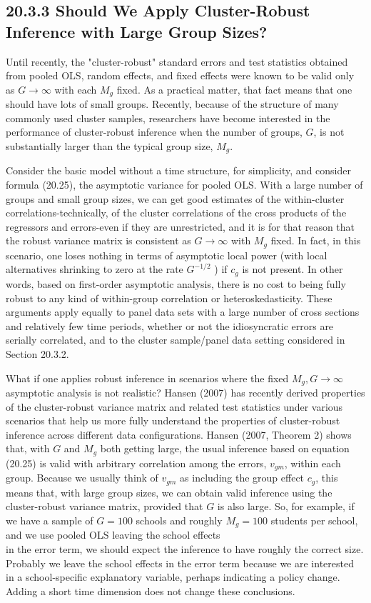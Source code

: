 \documentclass[10pt]{article}
\begin{document}
\subsection*{20.3.3 Should We Apply Cluster-Robust Inference with Large Group Sizes?}
Until recently, the "cluster-robust" standard errors and test statistics obtained from pooled OLS, random effects, and fixed effects were known to be valid only as $G \rightarrow \infty$ with each $M_{g}$ fixed. As a practical matter, that fact means that one should have lots of small groups. Recently, because of the structure of many commonly used cluster samples, researchers have become interested in the performance of cluster-robust inference when the number of groups, $G$, is not substantially larger than the typical group size, $M_{g}$.

Consider the basic model without a time structure, for simplicity, and consider formula (20.25), the asymptotic variance for pooled OLS. With a large number of groups and small group sizes, we can get good estimates of the within-cluster correlations-technically, of the cluster correlations of the cross products of the regressors and errors-even if they are unrestricted, and it is for that reason that the robust variance matrix is consistent as $G \rightarrow \infty$ with $M_{g}$ fixed. In fact, in this scenario, one loses nothing in terms of asymptotic local power (with local alternatives shrinking to zero at the rate $G^{-1 / 2}$ ) if $c_{g}$ is not present. In other words, based on first-order asymptotic analysis, there is no cost to being fully robust to any kind of within-group correlation or heteroskedasticity. These arguments apply equally to panel data sets with a large number of cross sections and relatively few time periods, whether or not the idiosyncratic errors are serially correlated, and to the cluster sample/panel data setting considered in Section 20.3.2.

What if one applies robust inference in scenarios where the fixed $M_{g}, G \rightarrow \infty$ asymptotic analysis is not realistic? Hansen (2007) has recently derived properties of the cluster-robust variance matrix and related test statistics under various scenarios that help us more fully understand the properties of cluster-robust inference across different data configurations. Hansen (2007, Theorem 2) shows that, with $G$ and $M_{g}$ both getting large, the usual inference based on equation (20.25) is valid with arbitrary correlation among the errors, $v_{g m}$, within each group. Because we usually think of $v_{g m}$ as including the group effect $c_{g}$, this means that, with large group sizes, we can obtain valid inference using the cluster-robust variance matrix, provided that $G$ is also large. So, for example, if we have a sample of $G=100$ schools and roughly $M_{g}=100$ students per school, and we use pooled OLS leaving the school effects\\
in the error term, we should expect the inference to have roughly the correct size. Probably we leave the school effects in the error term because we are interested in a school-specific explanatory variable, perhaps indicating a policy change. Adding a short time dimension does not change these conclusions.
\end{document}
